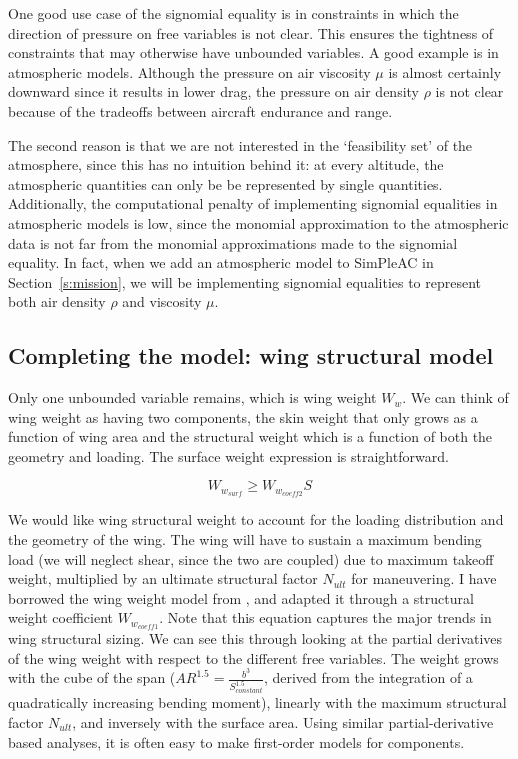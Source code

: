 One good use case of the signomial equality is in constraints in which the direction
of pressure on free variables is not clear. This ensures the tightness of constraints
that may otherwise have unbounded variables. A good example is in atmospheric models.
Although the pressure on air viscosity $\mu$ is almost certainly downward since it results in
lower drag, the pressure on air density $\rho$ is not clear because of the tradeoffs between
aircraft endurance and range.

The second reason is that we are not interested in the `feasibility set' of the atmosphere,
since this has no intuition behind it: at every altitude, the atmospheric quantities
can only be be represented by single quantities. Additionally, the computational penalty of
implementing signomial equalities in atmospheric models is low, since the monomial approximation
to the atmospheric data is not far from the monomial approximations made to the signomial equality.
In fact, when we add an atmospheric model to SimPleAC in
Section~\ref{s:mission}, we will be implementing signomial equalities to represent both air density
$\rho$ and viscosity $\mu$.

\subsection{Completing the model: wing structural model}
\label{s:wingstrc}

Only one unbounded variable remains, which is wing weight $W_w$. We can think
of wing weight as having two components, the skin weight that
only grows as a function of wing area and the structural weight which is a function of
both the geometry and loading. The surface weight expression is straightforward.

\begin{equation} W_{w_{surf}} \geq W_{w_{coeff2}} S \label{e:wwsurf} \end{equation}

We would like wing structural weight to account for the loading distribution and the geometry
of the wing. The wing will have to sustain a maximum bending load (we will neglect shear, since
the two are coupled) due to maximum takeoff weight,
multiplied by an ultimate structural factor $N_{ult}$ for maneuvering.
I have borrowed the wing weight model from \cite{gp_ac_design}, and adapted it through a
structural weight coefficient $W_{w_{coeff1}}$. Note that this equation captures the
major trends in wing structural sizing. We can see this through looking at the partial
derivatives of the wing weight with respect to the different free variables.
The weight grows with the cube of the span ($AR^{1.5} = \frac{b^3}{S_{constant}^{1.5}}$, derived
from the integration of a quadratically increasing bending moment),
linearly with the maximum structural factor $N_{ult}$, and inversely with the
surface area\footnotemark. Using similar partial-derivative based analyses, it
is often easy to make first-order models for components.

